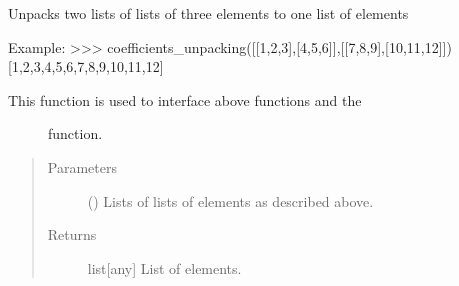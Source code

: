 \documentclass[letterpaper,10pt,english]{sphinxmanual}
\begin{document}
\begin{fulllineitems}
\label{\detokenize{mermin_eval:mermin_eval.coefficients_unpacking}}
Unpacks two lists of lists of three elements to one list of elements

Example:
\textgreater{}\textgreater{}\textgreater{}  coefficients\_unpacking({[}{[}1,2,3{]},{[}4,5,6{]}{]},{[}{[}7,8,9{]},{[}10,11,12{]}{]})
{[}1,2,3,4,5,6,7,8,9,10,11,12{]}
\begin{description}
\item[{This function is used to interface above  functions and the }] \leavevmode
{} function.

\end{description}
\begin{quote}\begin{description}
\item[{Parameters}] \leavevmode
{}\sphinxstyleliteralstrong{\sphinxupquote{, }} (\sphinxstyleliteralemphasis{\sphinxupquote{{[}}}\sphinxstyleliteralemphasis{\sphinxupquote{{[}}}\sphinxstyleliteralemphasis{\sphinxupquote{{[}}}\sphinxstyleliteralemphasis{\sphinxupquote{{]}}}\sphinxstyleliteralemphasis{\sphinxupquote{{]}}}\sphinxstyleliteralemphasis{\sphinxupquote{{]}}}) \textendash{} Lists of lists of 
elements as described above.

\item[{Returns}] \leavevmode
list{[}any{]} \textendash{} List of elements.

\end{description}\end{quote}

\end{fulllineitems}

\end{document}

